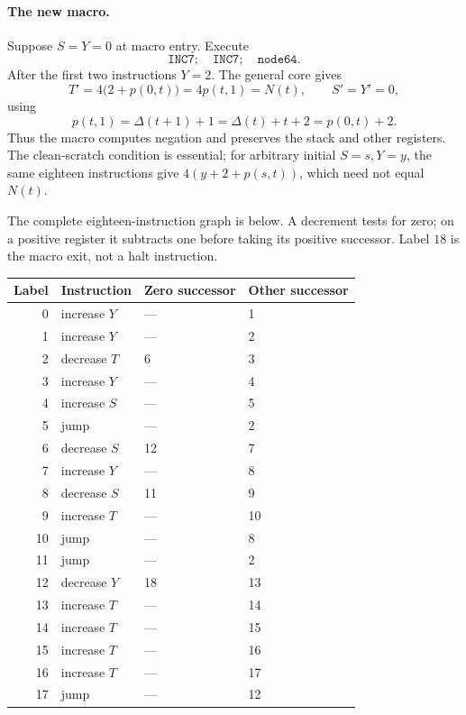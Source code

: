 \paragraph{The new macro.}
Suppose $S=Y=0$ at macro entry. Execute
\[
 \texttt{INC7};\quad\texttt{INC7};\quad\texttt{node64}.
\]
After the first two instructions $Y=2$. The general core gives
\[
 T'=4\bigl(2+p(0,t)\bigr)=4p(t,1)=N(t),
 \qquad S'=Y'=0,
\]
using
\[
 p(t,1)=\Delta(t+1)+1=\Delta(t)+t+2=p(0,t)+2.
\]
Thus the macro computes negation and preserves the stack and other
registers. The clean-scratch condition is essential; for arbitrary
initial $S=s,Y=y$, the same eighteen instructions give
$4(y+2+p(s,t))$, which need not equal $N(t)$.

The complete eighteen-instruction graph is below. A decrement tests for
zero; on a positive register it subtracts one before taking its positive
successor. Label $18$ is the macro exit, not a halt instruction.

\begin{center}
\begin{tabular}{rlll}
\hline
Label & Instruction & Zero successor & Other successor\\
\hline
0 & increase $Y$ & --- & 1\\
1 & increase $Y$ & --- & 2\\
2 & decrease $T$ & 6 & 3\\
3 & increase $Y$ & --- & 4\\
4 & increase $S$ & --- & 5\\
5 & jump & --- & 2\\
6 & decrease $S$ & 12 & 7\\
7 & increase $Y$ & --- & 8\\
8 & decrease $S$ & 11 & 9\\
9 & increase $T$ & --- & 10\\
10 & jump & --- & 8\\
11 & jump & --- & 2\\
12 & decrease $Y$ & 18 & 13\\
13 & increase $T$ & --- & 14\\
14 & increase $T$ & --- & 15\\
15 & increase $T$ & --- & 16\\
16 & increase $T$ & --- & 17\\
17 & jump & --- & 12\\
\hline
\end{tabular}
\end{center}

